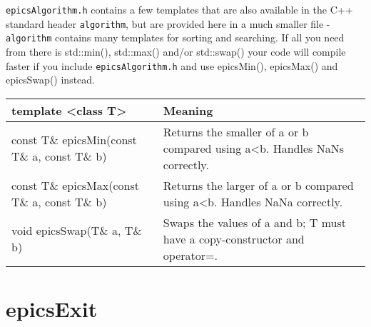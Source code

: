 \verb|epicsAlgorithm.h| contains a few templates that are also available in the C++ standard header \verb|algorithm|, but are 
provided here in a much smaller file - \verb|algorithm| contains many templates for sorting and searching.  If all you need 
from there is std::min(), std::max() and/or std::swap() your code will compile faster if you include \verb|epicsAlgorithm.h| 
and use epicsMin(), epicsMax() and epicsSwap() instead.
\begin{center}\begin{longtable}{p{2.5in}p{4.25in}}
\textbf{template \textless{}class T\textgreater{}} & \textbf{Meaning}\\
\hline
const T\& epicsMin(const T\& a, const T\& b) & Returns the smaller of a or b compared using a\textless{}b. Handles NaNs correctly.\\
const T\& epicsMax(const T\& a, const T\& b) & Returns the larger of a or b compared using a\textless{}b. Handles NaNa correctly.\\
void epicsSwap(T\& a, T\& b) & Swaps the values of a and b; T must have a copy-constructor and operator=.
\end{longtable}\end{center}


\section{epicsExit}


